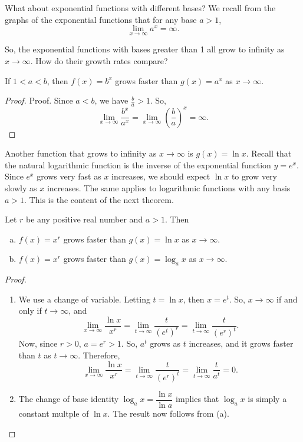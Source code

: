 What about exponential functions with different bases? We recall from the
graphs of the exponential functions that for any base $a>1$,%
\begin{equation*}
\lim_{x\to \infty}a^x=\infty.
\end{equation*}

So, the exponential functions with bases greater than 1 all grow to infinity
as $x\to \infty$. How do their growth rates compare?

\begin{theorem}{}{}
If $1<a<b$, then $f(x)=b^x$ grows faster than
$g(x)=a^x$ as $x\to \infty$.
\end{theorem}
\begin{proof}
Proof. Since $a<b$, we have $\frac{b}{a}>1$. So,%
\begin{equation*}
\lim_{x\to \infty}\frac{b^x}{a^x}=\lim_{x\to \infty}\left(\frac{b}{a}\right)^x=\infty.
\end{equation*}
\end{proof}

Another function that grows to infinity as $x\to \infty$ is
$g(x)=\ln x$. Recall that the natural logarithmic function is
the inverse of the exponential function $y=e^x$. Since $e^x$ grows very
fast as $x$ increases, we should expect $\ln x$ to grow very slowly as $x$
increases. The same applies to logarithmic functions with any basis $a>1$.
This is the content of the next theorem.

\begin{theorem}{}{}
Let $r$ be any positive real number and $a>1$. Then 

\begin{enumerate}[(a)]
\item	$f(x)=x^r$ grows faster than $g(x)=\ln x$ as $x\to \infty$.
\item	$f(x)=x^r$ grows faster than $g(x)=\log_{a}x$ as $x\to \infty$.
\end{enumerate}
\end{theorem}
\begin{proof}
\begin{enumerate}
\item	We use a change of variable. Letting $t=\ln x$, then $x=e^t$.
So, $x\to \infty$ if and only if $t\to \infty$, and 
\begin{equation*}
\lim_{x\to \infty}\frac{\ln x}{x^r}=\lim_{t\to \infty}\frac{t}{(e^t)^r}%
=\lim_{t\to \infty}\frac{t}{(e^r)^t}.
\end{equation*}%
Now, since $r>0$, $a=e^r>1$. So, $a^t$ grows as $t$ increases, and it
grows faster than $t$ as $t\to \infty$. Therefore,%
\begin{equation*}
\lim_{x\to \infty}\frac{\ln x}{x^{r}}%
=\lim_{t\to \infty}\frac{t}{(e^r)^t}=\lim_{t\to \infty}\frac{t}{a^t}=0.
\end{equation*}
\item	The change of base identity $\log_{a}x=\dfrac{\ln x}{\ln a}$ implies
that $\log_{a}x$ is simply a constant multple of $\ln x$. The result now
follows from (a).
\end{enumerate}
\end{proof}
